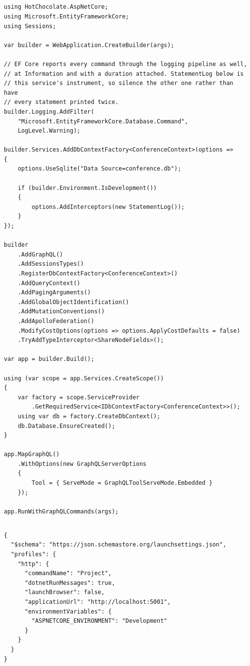 \subsection*{}
\begin{verbatim}
using HotChocolate.AspNetCore;
using Microsoft.EntityFrameworkCore;
using Sessions;

var builder = WebApplication.CreateBuilder(args);

// EF Core reports every command through the logging pipeline as well,
// at Information and with a duration attached. StatementLog below is
// this service's instrument, so silence the other one rather than have
// every statement printed twice.
builder.Logging.AddFilter(
    "Microsoft.EntityFrameworkCore.Database.Command",
    LogLevel.Warning);

builder.Services.AddDbContextFactory<ConferenceContext>(options =>
{
    options.UseSqlite("Data Source=conference.db");

    if (builder.Environment.IsDevelopment())
    {
        options.AddInterceptors(new StatementLog());
    }
});

builder
    .AddGraphQL()
    .AddSessionsTypes()
    .RegisterDbContextFactory<ConferenceContext>()
    .AddQueryContext()
    .AddPagingArguments()
    .AddGlobalObjectIdentification()
    .AddMutationConventions()
    .AddApolloFederation()
    .ModifyCostOptions(options => options.ApplyCostDefaults = false)
    .TryAddTypeInterceptor<ShareNodeFields>();

var app = builder.Build();

using (var scope = app.Services.CreateScope())
{
    var factory = scope.ServiceProvider
        .GetRequiredService<IDbContextFactory<ConferenceContext>>();
    using var db = factory.CreateDbContext();
    db.Database.EnsureCreated();
}

app.MapGraphQL()
    .WithOptions(new GraphQLServerOptions
    {
        Tool = { ServeMode = GraphQLToolServeMode.Embedded }
    });

app.RunWithGraphQLCommands(args);
\end{verbatim}

\subsection*{}
\begin{verbatim}
{
  "$schema": "https://json.schemastore.org/launchsettings.json",
  "profiles": {
    "http": {
      "commandName": "Project",
      "dotnetRunMessages": true,
      "launchBrowser": false,
      "applicationUrl": "http://localhost:5001",
      "environmentVariables": {
        "ASPNETCORE_ENVIRONMENT": "Development"
      }
    }
  }
}
\end{verbatim}

